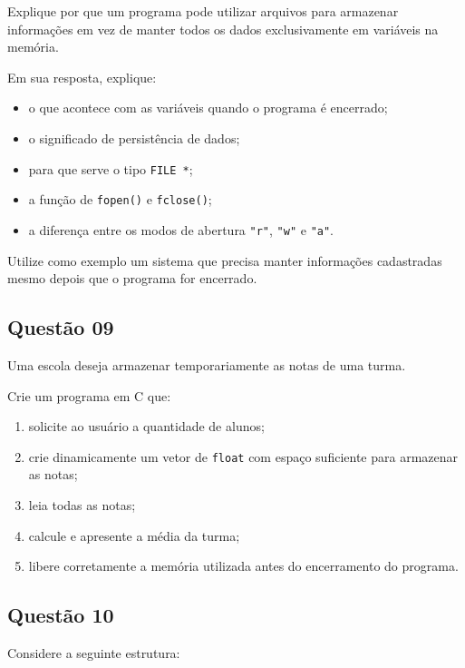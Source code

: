 \documentclass[12pt,a4paper]{article}
\begin{document}
Explique por que um programa pode utilizar arquivos para
armazenar informações em vez de manter todos os dados exclusivamente
em variáveis na memória.

Em sua resposta, explique:

\begin{itemize}
    \item o que acontece com as variáveis quando o programa é encerrado;
    \item o significado de persistência de dados;
    \item para que serve o tipo \texttt{FILE *};
    \item a função de \texttt{fopen()} e \texttt{fclose()};
    \item a diferença entre os modos de abertura \texttt{"r"},
          \texttt{"w"} e \texttt{"a"}.
\end{itemize}

Utilize como exemplo um sistema que precisa manter informações
cadastradas mesmo depois que o programa for encerrado.

\subsection*{Questão 09}

Uma escola deseja armazenar temporariamente as notas de uma turma.

Crie um programa em C que:

\begin{enumerate}
    \item solicite ao usuário a quantidade de alunos;
    \item crie dinamicamente um vetor de \texttt{float} com espaço
          suficiente para armazenar as notas;
    \item leia todas as notas;
    \item calcule e apresente a média da turma;
    \item libere corretamente a memória utilizada antes do encerramento
          do programa.
\end{enumerate}


\subsection*{Questão 10}

Considere a seguinte estrutura:
\end{document}
